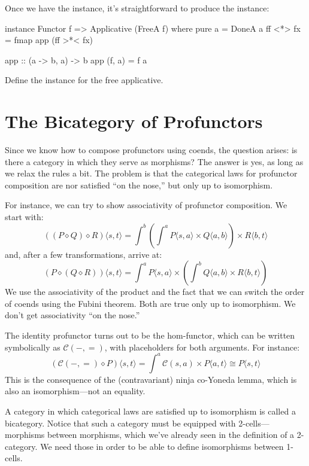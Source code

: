 \documentclass[DaoFP]{subfiles}
\begin{document}
Once we have the  instance, it's straightforward to produce the  instance:
\begin{haskell}
instance Functor f => Applicative (FreeA f) where
  pure a = DoneA a
  ff <*> fx = fmap app (ff >*< fx)
  
app :: (a -> b, a) -> b
app (f, a) = f a
\end{haskell}

\begin{exercise}
Define the  instance for the free applicative.
\end{exercise}


\section{The Bicategory of Profunctors}

Since we know how to compose profunctors using coends, the question arises: is there a category in which they serve as morphisms? The answer is yes, as long as we relax the rules a bit. The problem is that the categorical laws for profunctor composition are nor satisfied ``on the nose,'' but only up to isomorphism. 

For instance, we can try to show associativity of profunctor composition. We start with:
\[ ((P \diamond Q) \diamond R) \langle s, t \rangle = \int^b \left( \int^a P \langle s, a \rangle \times Q \langle a, b \rangle \right) \times R \langle b,  t \rangle \]
and, after a few transformations, arrive at:
\[ (P \diamond (Q \diamond R)) \langle s, t \rangle =  \int^a P \langle s, a \rangle \times \left( \int^b Q \langle a, b \rangle \times R \langle b,  t \rangle \right) \]
We use the associativity of the product and the fact that we can switch the order of coends using the Fubini theorem. Both are true only up to isomorphism. We don't get associativity ``on the nose.''

The identity profunctor turns out to be the hom-functor, which can be written symbolically as $\mathcal{C}(-, =)$, with placeholders for both arguments. For instance:
\[ \left( \mathcal{C}(-, =) \diamond P \right) \langle s, t \rangle = \int^a  \mathcal{C}(s, a) \times P \langle a, t \rangle \cong P \langle s, t \rangle \]
This is the consequence of the (contravariant) ninja co-Yoneda lemma, which is also an isomorphism---not an equality.

A category in which categorical laws are satisfied up to isomorphism is called a bicategory. Notice that such a category must be equipped with 2-cells---morphisms between morphisms, which we've already seen in the definition of a 2-category. We need those in order to be able to define isomorphisms between 1-cells. 
\end{document}
